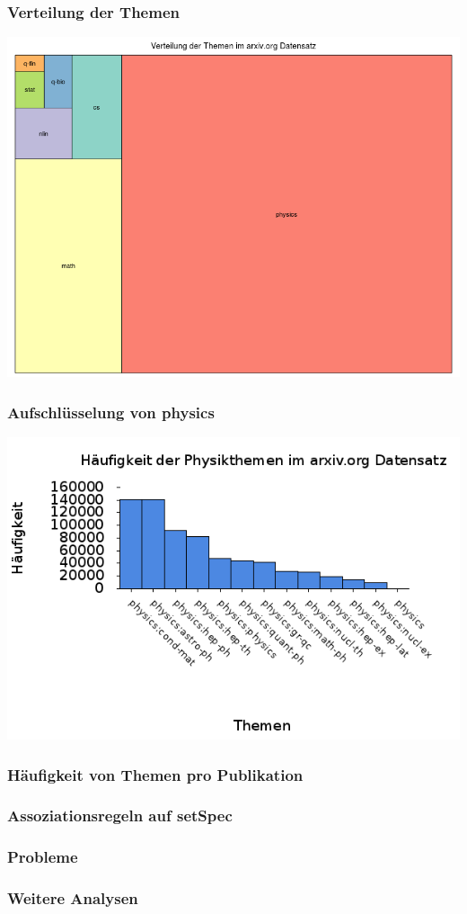 \documentclass[12pt,utf8]{beamer}
\begin{document}
\begin{frame}
	\frametitle{Verteilung der Themen}
	\begin{center}
		\includegraphics[scale=0.35]{../visual/treeParent.png}
	\end{center}
\end{frame}
\begin{frame}
	\frametitle{Aufschlüsselung von physics}
	\begin{center}
		\includegraphics[scale=0.45]{../visual/setSpecFreq.png}
	\end{center}
\end{frame}
\begin{frame}
	\frametitle{Häufigkeit von Themen pro Publikation}
\end{frame}
\begin{frame}
	\frametitle{Assoziationsregeln auf setSpec}
\end{frame}
\begin{frame}
	\frametitle{Probleme}
\end{frame}
\begin{frame}
	\frametitle{Weitere Analysen}
\end{frame}
\end{document}
